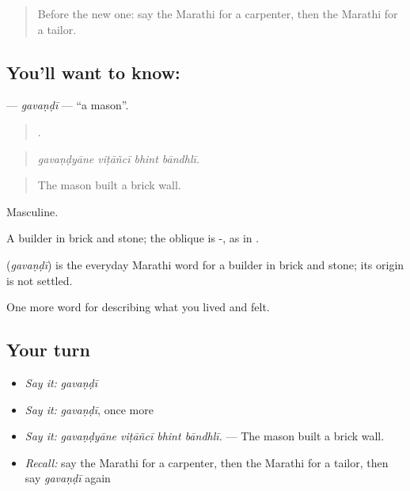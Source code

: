 \label{lesson:MR-C504-gavandi}



\begin{quote}
Before the new one: say the Marathi for a carpenter, then the Marathi for a tailor.
\end{quote}

\subsection*{You'll want to know: }
\textbf{} — \emph{gavaṇḍī} — \textquotedblleft{}a mason\textquotedblright{}.

\begin{quote}
   .
\end{quote}

\begin{quote}
\emph{gavaṇḍyāne viṭāñcī bhint bāndhlī.}
\end{quote}

\begin{quote}
The mason built a brick wall.
\end{quote}

Masculine.

A builder in brick and stone; the oblique is -, as in .

\begin{cousinweb}
\textbf{} (\emph{gavaṇḍī}) is the everyday Marathi word for a builder in brick and stone; its origin is not settled.
\end{cousinweb}

\begin{grammarlens}[title={What you've built}]
One more word for describing what you lived and felt.
\end{grammarlens}

\subsection*{Your turn}
\begin{itemize}
\raggedright
  \item \emph{Say it:} \emph{gavaṇḍī}
  \item \emph{Say it:} \emph{gavaṇḍī}, once more
  \item \emph{Say it:} \emph{gavaṇḍyāne viṭāñcī bhint bāndhlī.} — The mason built a brick wall.
  \item \emph{Recall:} say the Marathi for a carpenter, then the Marathi for a tailor, then say \emph{gavaṇḍī} again
\end{itemize}

